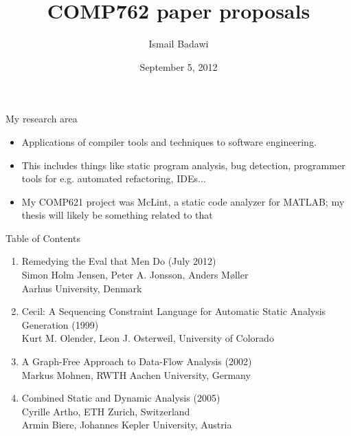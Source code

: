 \documentclass{beamer}
\title[COMP762 paper proposals]{COMP762 paper proposals}
\date{September 5, 2012}
\author{Ismail Badawi}
\begin{document}
\begin{frame}
\titlepage
\end{frame}



\begin{frame}{My research area}
\begin{itemize}
\item Applications of compiler tools and techniques to software engineering.
\item This includes things like static program analysis, bug detection, 
programmer tools for e.g. automated refactoring, IDEs...
\item My COMP621 project was McLint, a static code analyzer for MATLAB;
my thesis will likely be something related to that
\end{itemize}
\end{frame}

\begin{frame}{Table of Contents}
\begin{enumerate}
\item Remedying the Eval that Men Do (July 2012) \\ Simon Holm Jensen, Peter A. Jonsson, Anders M\o ller \\ Aarhus University, Denmark
\item Cecil: A Sequencing Constraint Language for Automatic Static Analysis
Generation (1999) \\ Kurt M. Olender, Leon J. Osterweil, University of Colorado
\item A Graph-Free Approach to Data-Flow Analysis (2002) \\ Markus Mohnen, RWTH Aachen University, Germany
\item Combined Static and Dynamic Analysis (2005) \\ Cyrille Artho, ETH Zurich, Switzerland \\ Armin Biere, Johannes Kepler University, Austria
\end{enumerate}
\end{frame}
\end{document}
